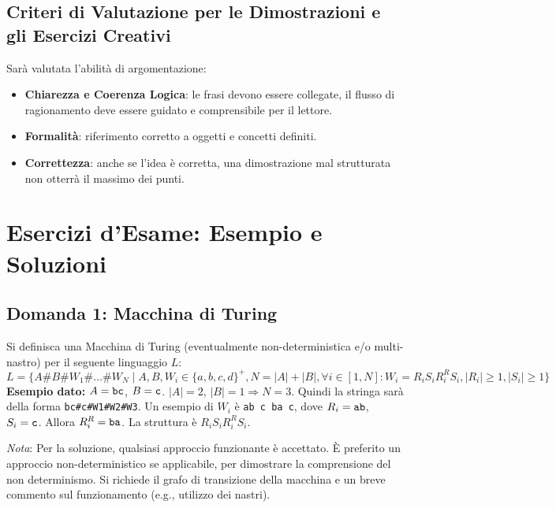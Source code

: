 \documentclass[a4paper, 11pt]{book} %
\theoremstyle{definition}
\begin{document}
\subsection{Criteri di Valutazione per le Dimostrazioni e gli Esercizi Creativi}
Sarà valutata l'abilità di argomentazione:
\begin{itemize}
    \item \textbf{Chiarezza e Coerenza Logica}: le frasi devono essere collegate, il flusso di ragionamento deve essere guidato e comprensibile per il lettore.
    \item \textbf{Formalità}: riferimento corretto a oggetti e concetti definiti.
    \item \textbf{Correttezza}: anche se l'idea è corretta, una dimostrazione mal strutturata non otterrà il massimo dei punti.
\end{itemize}

\section{Esercizi d'Esame: Esempio e Soluzioni}

\subsection{Domanda 1: Macchina di Turing}
Si definisca una Macchina di Turing (eventualmente non-deterministica e/o multi-nastro) per il seguente linguaggio $L$:
\[ L = \{ A \# B \# W_1 \# \dots \# W_N \mid A, B, W_i \in \{a,b,c,d\}^+, N = |A| + |B|, \forall i \in [1, N]: W_i = R_i S_i R_i^R S_i, |R_i| \ge 1, |S_i| \ge 1 \} \]
\textbf{Esempio dato:} $A = \text{\texttt{bc}}$, $B = \text{\texttt{c}}$. $|A|=2$, $|B|=1 \Rightarrow N = 3$.
Quindi la stringa sarà della forma \texttt{bc\#c\#W1\#W2\#W3}.
Un esempio di $W_i$ è \texttt{ab c ba c}, dove $R_i=\text{\texttt{ab}}$, $S_i=\text{\texttt{c}}$. Allora $R_i^R = \text{\texttt{ba}}$. La struttura è $R_i S_i R_i^R S_i$.

\textit{Nota}: Per la soluzione, qualsiasi approccio funzionante è accettato. È preferito un approccio non-deterministico se applicabile, per dimostrare la comprensione del non determinismo. Si richiede il grafo di transizione della macchina e un breve commento sul funzionamento (e.g., utilizzo dei nastri).
\end{document}
